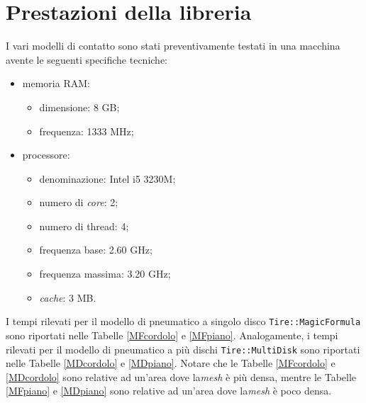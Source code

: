 \section{Prestazioni della libreria}
I vari modelli di contatto sono stati preventivamente testati in una macchina avente le seguenti specifiche tecniche:
\begin{itemize}
	\item memoria RAM:
	\begin{itemize}
		\item dimensione: 8 GB;
		\item frequenza: 1333 MHz;
	\end{itemize}
	\item processore:
	\begin{itemize}
		\item denominazione: Intel i5 3230M;
		\item numero di \textit{core}: 2;
		\item numero di thread: 4;
		\item frequenza base: 2.60 GHz;
		\item frequenza massima: 3.20 GHz;
		\item \textit{cache}: 3 MB.
	\end{itemize}
\end{itemize}
I tempi rilevati per il modello di pneumatico a singolo disco \texttt{Tire::MagicFormula} sono riportati nelle Tabelle \ref{MFcordolo} e \ref{MFpiano}. Analogamente, i tempi rilevati per il modello di pneumatico a più dischi \texttt{Tire::MultiDisk} sono riportati nelle Tabelle \ref{MDcordolo} e \ref{MDpiano}. Notare che le Tabelle \ref{MFcordolo} e \ref{MDcordolo} sono relative ad un'area dove la\textit{mesh} è più densa, mentre le Tabelle \ref{MFpiano} e \ref{MDpiano} sono relative ad un'area dove la\textit{mesh} è poco densa.\\[1cm]

